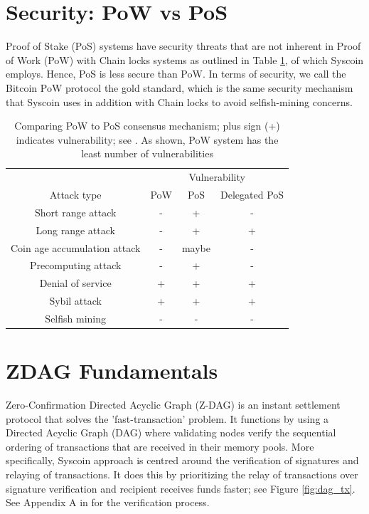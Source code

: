 \documentclass[peerreview]{ieeesyscoin}
\begin{document}
\section{Security: PoW vs PoS}

Proof of Stake (PoS) systems have security threats that are not inherent in Proof of Work (PoW) with Chain locks systems as outlined in Table \ref{table:pow_vs_pos}, of which Syscoin employs. Hence, PoS is less secure than PoW. In terms of security, we call the Bitcoin PoW protocol the gold standard, which is the same security mechanism that Syscoin uses in addition with Chain locks to avoid selfish-mining concerns.

\begin{table}[h!]
\centering
\begin{tabular}{ |c|c|c|c| } 
\hline
 & \multicolumn{3}{|c|}{ Vulnerability } \\
 Attack type & PoW & PoS & Delegated PoS \\
\hline
Short range attack & - & + & - \\
Long range attack & - & + & + \\
Coin age accumulation attack & - & maybe & - \\
Precomputing attack & - & + & - \\
Denial of service & + & + & + \\
Sybil attack & + & + & + \\
Selfish mining & - & - & - \\
\hline
\end{tabular}
\caption{Comparing PoW to PoS consensus mechanism; plus sign (+) indicates vulnerability; see \cite{Bit15}. As shown, PoW system has the least number of vulnerabilities}
\label{table:pow_vs_pos}
\end{table}

\section{ZDAG Fundamentals}

Zero-Confirmation Directed Acyclic Graph (Z-DAG) is an instant settlement protocol that solves the 'fast-transaction' problem. It functions by using a Directed Acyclic Graph (DAG) where validating nodes verify the sequential ordering of transactions that are received in their memory pools. More specifically, Syscoin approach is centred around the verification of signatures and relaying of transactions. It does this by prioritizing the relay of transactions over signature verification and recipient receives funds faster; see Figure \ref{fig:dag_tx}. See Appendix A in \cite{Sidb18} for the verification process.
\end{document}
